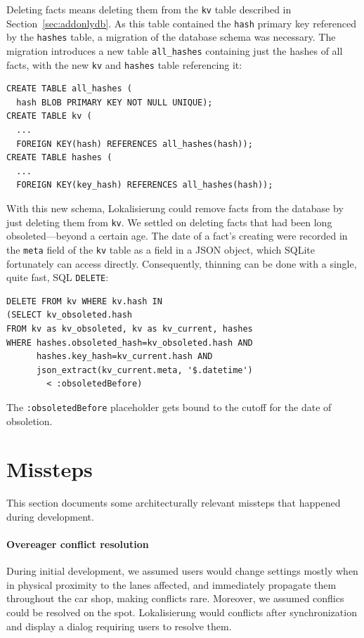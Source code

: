 \documentclass[sigplan,review]{acmart}
\begin{document}
Deleting facts means deleting them from the \texttt{kv} table
described in Section~\ref{sec:addonlydb}. As this table contained the
\texttt{hash} primary key referenced by the \texttt{hashes} table, a
migration of the database schema was necessary.  The migration
introduces a new table \texttt{all\_hashes} containing just the hashes
of all facts, with the new \texttt{kv} and
\texttt{hashes} table referencing it:
%
\begin{verbatim}
CREATE TABLE all_hashes (
  hash BLOB PRIMARY KEY NOT NULL UNIQUE);
CREATE TABLE kv (
  ...
  FOREIGN KEY(hash) REFERENCES all_hashes(hash));
CREATE TABLE hashes (
  ...
  FOREIGN KEY(key_hash) REFERENCES all_hashes(hash));
\end{verbatim}
%
With this new schema, Lokalisierung could remove facts from the
database by just deleting them from \texttt{kv}. We settled on deleting
facts that had been long obsoleted---beyond a certain age. The date
of a fact's creating were recorded in the \texttt{meta} field of the
\texttt{kv} table as a field in a JSON object, which SQLite
fortunately can access directly.  Consequently, thinning can be
done with a single, quite fast, SQL \texttt{DELETE}:
%
\begin{verbatim}
DELETE FROM kv WHERE kv.hash IN
(SELECT kv_obsoleted.hash
FROM kv as kv_obsoleted, kv as kv_current, hashes
WHERE hashes.obsoleted_hash=kv_obsoleted.hash AND
      hashes.key_hash=kv_current.hash AND
      json_extract(kv_current.meta, '$.datetime')
        < :obsoletedBefore)
\end{verbatim}
%
The \texttt{:obsoletedBefore} placeholder gets bound to the cutoff for
the date of obsoletion.

\section{Missteps}
\label{sec:missteps}

This section documents some architecturally relevant missteps that
happened during development.

\paragraph{Overeager conflict resolution} During initial development,
we assumed users would change settings mostly when in physical
proximity to the lanes affected, and immediately propagate them
throughout the car shop, making conflicts rare.  Moreover, we
assumed conflics could be resolved on the spot.  
Lokalisierung would conflicts after synchronization and display a
dialog requiring users to resolve them.
\end{document}
